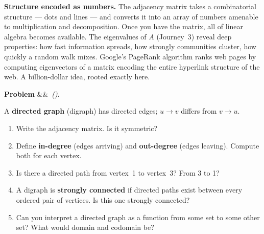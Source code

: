 \documentclass[12pt, a4paper]{article}
\newcounter{problem}
\newenvironment{problem}[1][]{%
  \refstepcounter{problem}%
  \par\vspace{6pt}%
  \noindent\textbf{\color{MidBlue}Problem \theproblem}%
  \ifx&#1&\else\ \textit{(#1)}\fi\textbf{.}\enskip
}{\par\vspace{4pt}}
\begin{document}
\begin{thought}
\textbf{Structure encoded as numbers.}
The adjacency matrix takes a combinatorial structure --- dots and lines --- and converts it into an array of numbers amenable to multiplication and decomposition. Once you have the matrix, all of linear algebra becomes available. The eigenvalues of $A$ (Journey~3) reveal deep properties: how fast information spreads, how strongly communities cluster, how quickly a random walk mixes. Google's PageRank algorithm ranks web pages by computing eigenvectors of a matrix encoding the entire hyperlink structure of the web. A billion-dollar idea, rooted exactly here.
\end{thought}

\begin{problem}
\label{prob:directed}
A \textbf{directed graph} (digraph) has directed edges; $u \to v$ differs from $v \to u$.

\begin{center}
\end{center}

\begin{enumerate}[label=(\alph*),topsep=2pt]
  \item Write the adjacency matrix. Is it symmetric?
  \item Define \textbf{in-degree} (edges arriving) and \textbf{out-degree} (edges leaving). Compute both for each vertex.
  \item Is there a directed path from vertex~1 to vertex~3? From 3 to 1?
  \item A digraph is \textbf{strongly connected} if directed paths exist between every ordered pair of vertices. Is this one strongly connected?
  \item Can you interpret a directed graph as a function from some set to some other set? What would domain and codomain be?
\end{enumerate}
\end{problem}
\end{document}
